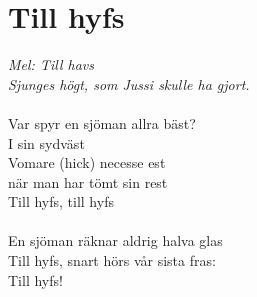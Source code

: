 \documentclass[a5paper,15pt]{article}
\begin{document}
\section{Till hyfs}
\emph{Mel: Till havs\\
Sjunges högt, som Jussi skulle ha gjort.}\\
\\
Var spyr en sjöman allra bäst?\\
I sin sydväst\\
Vomare (hick) necesse est\\
när man har tömt sin rest\\
Till hyfs, till hyfs\\
\\
En sjöman räknar aldrig halva glas\\
Till hyfs, snart hörs vår sista fras:\\
Till hyfs!\\
\\
\end{document}
